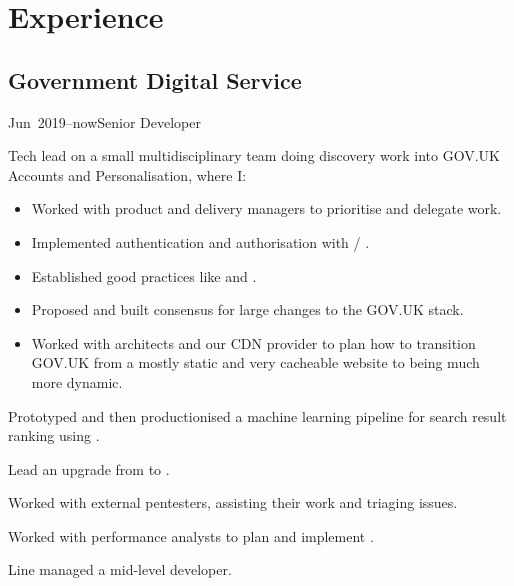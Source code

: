 \documentclass[a4paper]{barrucadu-cv}
\newcommand{\range}[2]{#1–#2}
\newcommand{\orange}[1]{\range{#1}{now}}
\begin{document}
\section{Experience}

\subsection{Government Digital Service}

\begin{cventry}{\orange{Jun~2019}}{Senior Developer}
  \begin{tightitemize}
  \item Tech lead on a small multidisciplinary  team
    doing discovery work into GOV.UK Accounts and Personalisation, where I:

    \begin{itemize}
    \item Worked with product and delivery managers to prioritise and delegate work.
    \item Implemented authentication and authorisation with  / .
    \item Established good practices like  and .
    \item Proposed and built consensus for large changes to the GOV.UK stack.
    \item Worked with architects and our CDN provider to plan how to transition GOV.UK from a mostly static and very cacheable website to being much more dynamic.
    \end{itemize}

  \item Prototyped and then productionised a machine learning pipeline
    for search result ranking using .

  \item Lead an upgrade from  to
    .

  \item Worked with external pentesters, assisting their work and
    triaging issues.

  \item Worked with performance analysts to plan and implement
    .

  \item Line managed a mid-level developer.
  \end{tightitemize}
\end{cventry}
\end{document}
